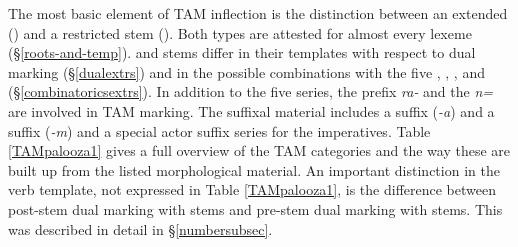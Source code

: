 The most basic element of TAM inflection is the distinction between an extended (\Ext) and a restricted stem (\Rs). Both types are attested for almost every  lexeme (\S{}\ref{roots-and-temp}). \Ext{} and \Rs{} stems differ in their templates with respect to dual marking (\S{}\ref{dualextrs}) and in the possible combinations with the five  \Alph, \Bet, \Betaone, \Betatwo{} and \Gam{} (\S{}\ref{combinatoricsextrs}). In addition to the five series, the  prefix \emph{ra-} and the   \emph{n=} are involved in TAM marking. The suffixal material includes a  suffix (\emph{-a}) and a  suffix (\emph{-m}) and a special actor suffix series for the imperatives. Table \ref{TAMpalooza1} gives a full overview of the TAM categories and the way these are built up from the listed morphological material. An important distinction in the verb template, not expressed in Table \ref{TAMpalooza1}, is the difference between post-stem dual marking with \Ext{} stems and pre-stem dual marking with \Rs{} stems. This was described in detail in \S{}\ref{numbersubsec}.\\


